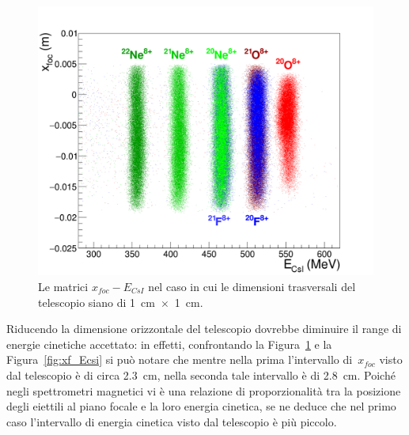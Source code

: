 \begin{figure} [!p]
	\centering
	\includegraphics[width=\textwidth, keepaspectratio]{Grafici_Tesi2/1per1new/xf_ecsi_quadrata_menoeventi.png}
	\caption{Le matrici $x_{foc} - E_{CsI}$ nel caso in cui le dimensioni trasversali del telescopio siano di 1~cm~$\times$~1~cm.} \label{fig:xf_ecsi_1per1}
\end{figure} 

Riducendo la dimensione orizzontale del telescopio dovrebbe diminuire il range di energie cinetiche accettato: in effetti, confrontando la Figura~\ref{fig:xf_ecsi_1per1} e la Figura~\ref{fig:xf_Ecsi} si può notare che mentre nella prima l'intervallo di~$x_{foc}$ visto dal telescopio è di circa 2.3~cm, nella seconda tale intervallo è di 2.8~cm. Poiché negli spettrometri magnetici vi è una relazione di proporzionalità tra la posizione degli eiettili al piano focale e la loro energia cinetica, se ne deduce che nel primo caso l'intervallo di energia cinetica visto dal telescopio è più piccolo.
 





